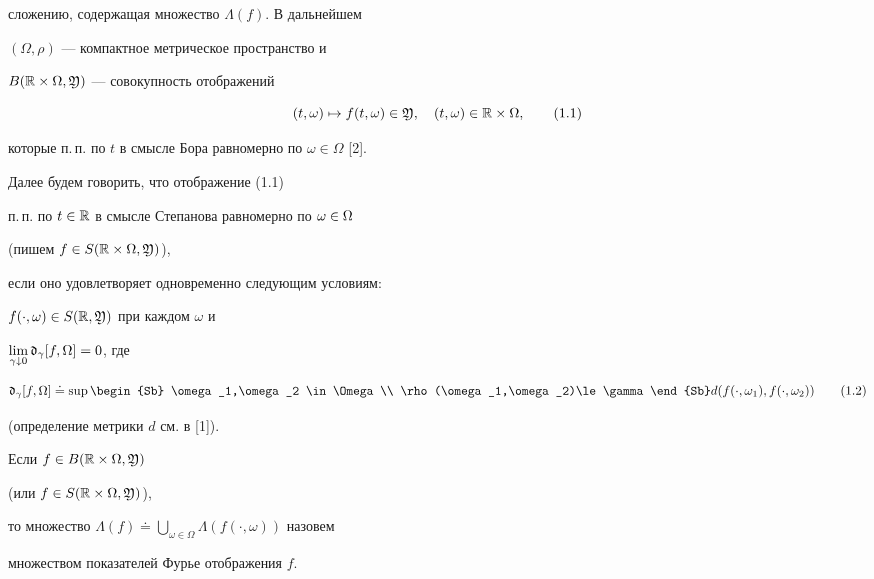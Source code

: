 сложению, содержащая множество $\Lambda (f)$. В дальнейшем


$(\Omega,\rho)$ --- компактное метрическое пространство и


$B(\Bbb R\times\Omega,\frak Y)$ --- совокупность отображений


\begin{equation}


\tm\mapsto f\tm\in\frak Y,


\quad\tm\in \Bbb R\times\Omega,


\tag{1.1}


\end{equation}


которые п.\,п. по $t$ в смысле Бора равномерно по $\omega\in \Omega$ [2].


Далее будем говорить, что отображение (1.1)


п.\,п. по $t\in\Bbb R$ в смысле Степанова равномерно по $\omega\in\Omega$


(пишем $f\in S(\Bbb R\times\Omega,\frak Y)$),


если оно удовлетворяет одновременно следующим условиям:


$f(\cdot,\omega)\in S(\Bbb R,\frak Y)$ при каждом $\omega$ и


$\lim\limits_{\gamma\downarrow 0}\frak d_{\gamma}[f,\Omega]=0$, где


\begin{equation}


\frak d_{\gamma}[f,\Omega]\doteq\sup


\begin{Sb}


\omega_1,\omega_2 \in\Omega\\ \rho(\omega_1,\omega_2)\le \gamma\end{Sb}


d(f(\cdot,\omega_1),f(\cdot,\omega_2))\tag{1.2}


\end{equation}


(определение метрики $d$ см. в [1]).


Если $f\in B(\Bbb R\times\Omega,\frak Y)$


(или $f\in S(\Bbb R\times\Omega,\frak Y)$),


то множество $\Lambda(f)\doteq


\bigcup\limits_{\omega\in\Omega}\Lambda (f(\cdot,\omega))$ назовем


множеством показателей Фурье отображения $f$.





